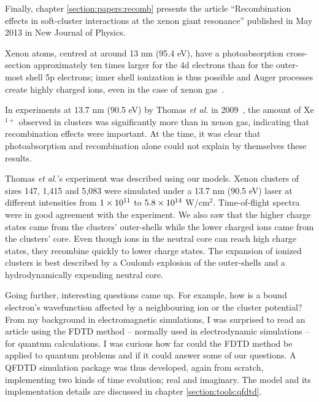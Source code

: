 
Finally, chapter \ref{section:papers:recomb} presents the article ``Recombination
effects in soft-\xray cluster interactions at the xenon giant resonance''
published in May 2013 in New Journal of Physics.

Xenon atoms, centred at around 13 nm (95.4 eV), have a photoabsorption
cross-section approximately ten times larger for the 4d electrons than for the
outer-most shell 5p electrons; inner shell ionization is thus possible and
Auger processes create highly charged ions, even in the case of xenon
gas~\cite{Uiberacker2007}.

In experiments at 13.7 nm (90.5 eV) by Thomas \textit{et al.} in
2009~\cite{Thomas2009}, the amount of Xe$^{1+}$ observed in clusters was
significantly more than in xenon gas, indicating that recombination effects were
important. At the time, it was clear that photoabsorption and recombination alone
could not explain by themselves these results.

Thomas \textit{et al.}'s experiment was described using our models. Xenon
clusters of sizes 147, 1,415 and 5,083 were simulated under a 13.7 nm
(90.5 eV) laser at different intensities from $\ten{1}{11}$ to
$\ten{5.8}{14}$ W/cm$^2$. Time-of-flight spectra were in good agreement with the
experiment. We also saw that the higher charge states came from the clusters'
outer-shells while the lower charged ions came from the clusters' core. Even
though ions in the neutral core can reach high charge states, they recombine
quickly to lower charge states. The expansion of ionized clusters is best
described by a Coulomb explosion of the outer-shells and a hydrodynamically
expending neutral core.




Going further, interesting questions came up. For example, how is a bound
electron's wavefunction affected by a neighbouring ion or the cluster potential?
From my background in electromagnetic simulations, I was surprised to read
an article using the FDTD method -- normally used in electrodynamic simulations --
for quantum calculations. I was curious how far could the FDTD method be
applied to quantum problems and if it could answer some of our questions.
A QFDTD simulation package was thus developed, again from scratch,  implementing
two kinds of time evolution; real and imaginary. The model and its implementation details
are discussed in chapter \ref{section:tools:qfdtd}.

